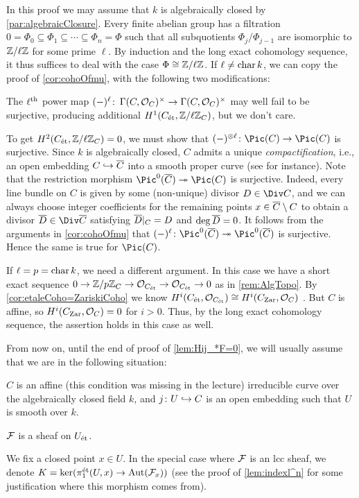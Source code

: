 \begin{proof*}
	In this proof we may assume that $k$ is algebraically closed by \cref{par:algebraicClosure}. Every finite abelian group has a filtration  $0=\Phi_0\subseteq \Phi_1\subseteq \dotsb\subseteq \Phi_n=\Phi$ such that all subquotients $\Phi_j/\Phi_{j-1}$ are isomorphic to $\mathbb{Z}/\ell\mathbb{Z}$ for some prime $\ell$. By induction and the long exact cohomology sequence, it thus suffices to deal with the case $\Phi\cong \mathbb{Z}/\ell\mathbb{Z}$. If $\ell\neq \operatorname{char} k$, we can copy the proof of \cref{cor:cohoOfmu}, with the following two modifications:
	\begin{numerate}
		\item The $\ell^{\text{th}}$ power map $(-)^\ell\colon \Global(C,\Oo_C)^\times\morphism \Global(C,\Oo_C)^\times$ may well fail to be surjective, producing additional $H^1(C_{\mathrm{\acute{e}t}},\mathbb{Z}/\ell\mathbb{Z}_C)$, but we don't care.
		\item To get $H^2(C_{\mathrm{\acute{e}t}},\mathbb{Z}/\ell\mathbb{Z}_C)=0$, we must show that $(-)^{\otimes \ell}\colon \Pic(C)\morphism \Pic(C)$ is surjective. Since $k$ is algebraically closed, $C$ admits a unique \emph{compactification}, i.e., an open embedding $C\monomorphism\ov{C}$ into a smooth proper curve (see \cite[Section~I.6]{hartshorne} for instance). Note that the restriction morphism $\Pic^0(\ov{C})\epimorphism \Pic(C)$ is surjective. Indeed, every line bundle on $C$ is given by some (non-unique) divisor $D\in \Div C$, and we can always choose integer coefficients for the remaining points $x\in \ov{C}\setminus C$ to obtain a divisor $\ov{D}\in \Div \ov{C}$ satisfying $\ov{D}|_C=D$ and $\deg \ov{D}=0$. It follows from the arguments in \cref{cor:cohoOfmu} that $(-)^\ell\colon \Pic^0(\ov{C})\epimorphism \Pic^0(\ov{C})$ is surjective. Hence the same is true for $\Pic(C)$.
	\end{numerate}
	If $\ell=p=\operatorname{char} k$, we need a different argument. In this case we have a short exact sequence $0\morphism \IZ/p\IZ_C\morphism \Oo_{C_\et}\morphism\Oo_{C_\et}\morphism 0$ as in \cref{rem:AlgTopo}. By \cref{cor:etaleCoho=ZariskiCoho} we know $H^i(C_{\mathrm{\acute{e}t}},\mathcal{O}_{C_{\mathrm{\acute{e}t}}})\cong H^i(C_{\mathrm{Zar}},\mathcal{O}_C)$ . But $C$ is affine, so $H^i(C_{\mathrm{Zar}},\mathcal{O}_C)=0$ for $i>0$. Thus, by the long exact cohomology sequence, the assertion holds in this case as well.
\end{proof*}
\label{sit:UandCandF}
From now on, until the end of proof of \cref{lem:Hij_*F=0}, we will usually assume that we are in the following situation:
\begin{numerate}
	\item $C$ is an affine (this condition was missing in the lecture) irreducible curve over the algebraically closed field $k$, and $j\colon U\monomorphism C$ is an open embedding such that $U$ is smooth over $k$.
	\item $\mathcal{F}$ is a sheaf on $U_{\mathrm{\acute{e}t}}$.
	\item We fix a closed point $x\in U$. In the special case where $\mathcal{F}$ is an lcc sheaf, we denote $K=\ker(\pi_1^\et(U,x)\morphism \Aut(\Ff_x))$ (see the proof of \cref{lem:indexl^n} for some justification where this morphism comes from).
\end{numerate}
